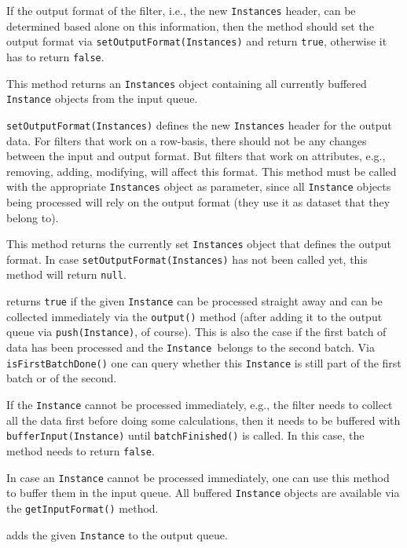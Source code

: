 If the output format of the filter, i.e., the new \texttt{Instances} header, can
be determined based alone on this information, then the method should set the
output format via \texttt{setOutputFormat(Instances)} and return \texttt{true},
otherwise it has to return \texttt{false}.

This method returns an \texttt{Instances} object containing all currently
buffered \texttt{Instance} objects from the input queue.

\texttt{setOutputFormat(Instances)} defines the new \texttt{Instances} header
for the output data. For filters that work on a row-basis, there should not be
any changes between the input and output format. But filters that work on
attributes, e.g., removing, adding, modifying, will affect this format. This
method must be called with the appropriate \texttt{Instances} object as
parameter, since all \texttt{Instance} objects being processed will rely on the
output format (they use it as dataset that they belong to).

This method returns the currently set \texttt{Instances} object that defines the
output format. In case \texttt{setOutputFormat(Instances)} has not been called
yet, this method will return \texttt{null}.

 returns \texttt{true} if the given
\texttt{Instance} can be processed straight away and can be collected
immediately via the \texttt{output()} method (after adding it to the output
queue via \texttt{push(Instance)}, of course). This is also the case if the
first batch of data has been processed and the \texttt{Instance }belongs to the
second batch. Via \texttt{isFirstBatchDone()} one can query whether this
\texttt{Instance} is still part of the first batch or of the second.

If the \texttt{Instance} cannot be processed immediately, e.g., the filter needs
to collect all the data first before doing some calculations, then it needs to
be buffered with \texttt{bufferInput(Instance)} until \texttt{batchFinished()}
is called. In this case, the method needs to return \texttt{false}.

In case an \texttt{Instance} cannot be processed immediately, one can use this
method to buffer them in the input queue. All buffered \texttt{Instance} objects
are available via the \texttt{getInputFormat()} method.

adds the given \texttt{Instance} to the output queue.

